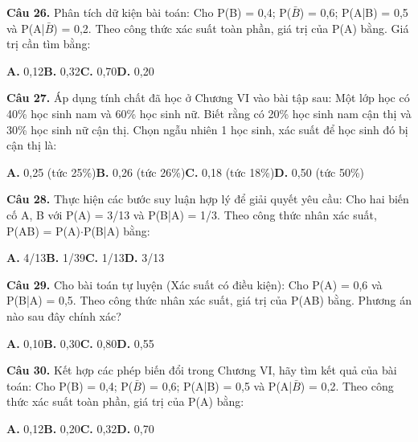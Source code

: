 \documentclass[11pt,a4paper]{article}
\begin{document}
\textbf{\color{primary} Câu 26.} Phân tích dữ kiện bài toán: Cho P(B) = 0,4; P($\bar{B}$) = 0,6; P(A|B) = 0,5 và P(A|$\bar{B}$) = 0,2. Theo công thức xác suất toàn phần, giá trị của P(A) bằng. Giá trị cần tìm bằng:\par
\hspace*{1.5em}\textbf{A.} 0,12\quad\quad \textbf{B.} 0,32\quad\quad \textbf{C.} 0,70\quad\quad \textbf{D.} 0,20\par\vspace{2pt}
\textbf{\color{primary} Câu 27.} Áp dụng tính chất đã học ở Chương VI vào bài tập sau: Một lớp học có 40\% học sinh nam và 60\% học sinh nữ. Biết rằng có 20\% học sinh nam cận thị và 30\% học sinh nữ cận thị. Chọn ngẫu nhiên 1 học sinh, xác suất để học sinh đó bị cận thị là:\par
\hspace*{1.5em}\textbf{A.} 0,25 (tức 25\%)\quad\quad \textbf{B.} 0,26 (tức 26\%)\quad\quad \textbf{C.} 0,18 (tức 18\%)\quad\quad \textbf{D.} 0,50 (tức 50\%)\par\vspace{2pt}
\textbf{\color{primary} Câu 28.} Thực hiện các bước suy luận hợp lý để giải quyết yêu cầu: Cho hai biến cố A, B với P(A) = 3/13 và P(B|A) = 1/3. Theo công thức nhân xác suất, P(AB) = P(A)$\cdot$P(B|A) bằng:\par
\hspace*{1.5em}\textbf{A.} 4/13\quad\quad \textbf{B.} 1/39\quad\quad \textbf{C.} 1/13\quad\quad \textbf{D.} 3/13\par\vspace{2pt}
\textbf{\color{primary} Câu 29.} Cho bài toán tự luyện (Xác suất có điều kiện): Cho P(A) = 0,6 và P(B|A) = 0,5. Theo công thức nhân xác suất, giá trị của P(AB) bằng. Phương án nào sau đây chính xác?\par
\hspace*{1.5em}\textbf{A.} 0,10\quad\quad \textbf{B.} 0,30\quad\quad \textbf{C.} 0,80\quad\quad \textbf{D.} 0,55\par\vspace{2pt}
\textbf{\color{primary} Câu 30.} Kết hợp các phép biến đổi trong Chương VI, hãy tìm kết quả của bài toán: Cho P(B) = 0,4; P($\bar{B}$) = 0,6; P(A|B) = 0,5 và P(A|$\bar{B}$) = 0,2. Theo công thức xác suất toàn phần, giá trị của P(A) bằng:\par
\hspace*{1.5em}\textbf{A.} 0,12\quad\quad \textbf{B.} 0,20\quad\quad \textbf{C.} 0,32\quad\quad \textbf{D.} 0,70\par\vspace{2pt}
\end{document}
